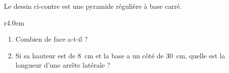
\begin{exercice}\label{exo2smath-0180}


Le dessin ci-contre est une pyramide régulière à base carré.
\begin{wrapfigure}{r}{4.0cm}
   \centering
   
\end{wrapfigure}
\begin{enumerate}
    \item
Combien de face a-t-il ?
    \item
        Si sa hauteur est de \SI{8}{\centi\meter} et la base a un côté de \SI{30}{\centi\meter}, quelle est la longueur d'une arrête latérale ?
\end{enumerate}

\end{exercice}
